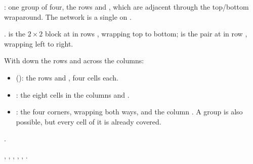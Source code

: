

: one group of four, the rows  and , which
are adjacent through the top/bottom wraparound. The network is a single  on .

.  is the $2\times2$ block at  in
rows , wrapping top to bottom;  is the pair at  in
row , wrapping left to right.

With  down the rows and  across the columns:
\begin{itemize}
  \item {} (): the rows  and , four
    cells each.
  \item {}: the eight cells in the columns  and .
  \item {}: the four corners, wrapping both ways, and the column . A
    group  is also possible, but every cell of it is already covered.
\end{itemize}

.

 ,  ,  ,
 ,  ,  .

